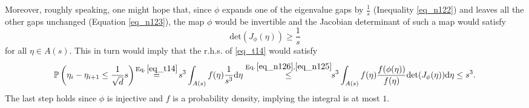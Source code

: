 \documentclass[11pt,letterpaper]{article}
\begin{document}
\noindent
Moreover, roughly speaking, one might hope that, since $\phi$ expands one of the eigenvalue gaps by $\frac{1}{s}$  (Inequality \eqref{eq_n122}) and leaves all the other gaps unchanged (Equation \eqref{eq_n123}), the map $\phi$ would be invertible and the Jacobian determinant of such a map would satisfy 
%
\begin{equation}\label{eq_n125}
\mathrm{det}(J_\phi(\eta)) \geq \frac{1}{s}
\end{equation}
 for all $\eta \in A(s)$.
%
%
This in turn would imply that the r.h.s. of \eqref{eq_t14} would satisfy
%
\begin{eqnarray}\label{eq_t15}
   \mathbb{P}\left(\eta_i - \eta_{i+1} \leq \frac{1}{\sqrt{d}} s\right) \!
  \stackrel{\textrm{Eq.}\, \eqref{eq_t14}}{=}  \! s^3 \int_{A(s)}   f(\eta)  \frac{1}{s^3} \mathrm{d} \eta 
 \stackrel{\textrm{Eq.}\, \eqref{eq_n126}, \eqref{eq_n125}}{ \leq} \!\! s^3 \int_{A(s)}  f(\eta)   \frac{f(\phi(\eta))}{f(\eta)}  \mathrm{det}(J_\phi(\eta))  \mathrm{d} \eta
% 
  \leq s^3.
  \end{eqnarray}
%
The last step holds since $\phi$ is injective and $f$ is a probability density, implying the integral is at most $1$.
\color{black}
\end{document}
